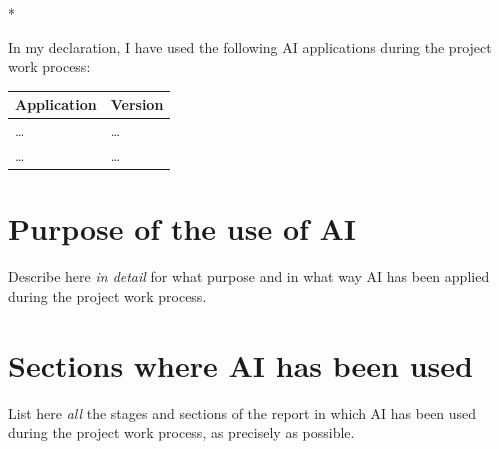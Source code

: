 \begin{aidisclaimer} * %

In my declaration, I have used the following AI applications during the
project work process:

\begin{center}
    \begin{tabularx}{\linewidth}{Xl}
        \hline\hline
        \textbf{Application} & \textbf{Version} \\
        \hline
        \dots & \dots \\
        \dots & \dots \\
        \hline\hline
    \end{tabularx}
\end{center}

\section*{Purpose of the use of AI}

Describe here \emph{in detail} for what purpose and in what way AI has been
applied during the project work process.

\section*{Sections where AI has been used}

List here \emph{all} the stages and sections of the report in which AI has
been used during the project work process, as precisely as possible.

\end{aidisclaimer}
